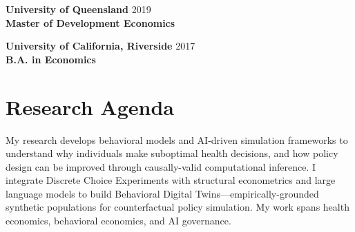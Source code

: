 \documentclass[11pt, letterpaper]{article}
\begin{document}
\vspace{0.5em}
\noindent \textbf{University of Queensland} \hfill 2019 \\
\textbf{Master of Development Economics}

\vspace{0.5em}
\noindent \textbf{University of California, Riverside} \hfill 2017 \\
\textbf{B.A. in Economics}

\section*{Research Agenda}
\vspace{0.3em}
My research develops behavioral models and AI-driven simulation frameworks to understand why individuals make suboptimal health decisions, and how policy design can be improved through causally-valid computational inference. I integrate Discrete Choice Experiments with structural econometrics and large language models to build Behavioral Digital Twins---empirically-grounded synthetic populations for counterfactual policy simulation. My work spans health economics, behavioral economics, and AI governance.
\end{document}

